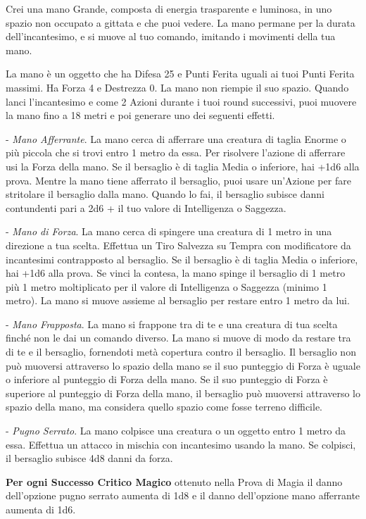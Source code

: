 \begin{multicols}{2}
Crei una mano Grande, composta di energia trasparente e luminosa, in uno spazio non occupato a gittata e che puoi vedere. La mano permane per la durata dell'incantesimo, e si muove al tuo comando, imitando i movimenti della tua mano.

La mano è un oggetto che ha Difesa 25 e Punti Ferita uguali ai tuoi Punti Ferita massimi. Ha Forza 4 e Destrezza 0. La mano non riempie il suo spazio.
Quando lanci l'incantesimo e come 2 Azioni durante i tuoi round successivi, puoi muovere la mano fino a 18 metri e poi generare uno dei seguenti effetti.

\medskip

- \emph{Mano Afferrante}. La mano cerca di afferrare una creatura di taglia Enorme o più piccola che si trovi entro 1 metro da essa. Per risolvere l'azione di afferrare usi la Forza della mano. Se il bersaglio è di taglia Media o inferiore, hai +1d6 alla prova. Mentre la mano tiene afferrato il bersaglio, puoi usare un'Azione per fare stritolare il bersaglio dalla mano. Quando lo fai, il bersaglio subisce danni contundenti pari a 2d6 + il tuo valore di Intelligenza o Saggezza.

- \emph{Mano di Forza}. La mano cerca di spingere una creatura di 1 metro in una direzione a tua scelta. Effettua un Tiro Salvezza su Tempra con modificatore da incantesimi contrapposto al bersaglio. Se il bersaglio è di taglia Media o inferiore, hai +1d6 alla prova. Se vinci la contesa, la mano spinge il bersaglio di 1 metro più 1 metro moltiplicato per il valore di Intelligenza o Saggezza (minimo 1 metro). La mano si muove assieme al bersaglio per restare entro 1 metro da lui.

- \emph{Mano Frapposta}. La mano si frappone tra di te e una creatura di tua scelta finché non le dai un comando diverso. La mano si muove di modo da restare tra di te e il bersaglio, fornendoti metà copertura contro il bersaglio. Il bersaglio non può muoversi attraverso lo spazio della mano se il suo punteggio di Forza è uguale o inferiore al punteggio di Forza della mano. Se il suo punteggio di Forza è superiore al punteggio di Forza della mano, il bersaglio può muoversi attraverso lo spazio della mano, ma considera quello spazio come fosse terreno difficile.

- \emph{Pugno Serrato}. La mano colpisce una creatura o un oggetto entro 1 metro da essa. Effettua un attacco in mischia con incantesimo usando la mano. Se colpisci, il bersaglio subisce 4d8 danni da forza.

\textbf{Per ogni Successo Critico Magico} ottenuto nella Prova di Magia il danno dell'opzione pugno serrato aumenta di 1d8 e il danno dell'opzione mano afferrante aumenta di 1d6.


\end{multicols}
